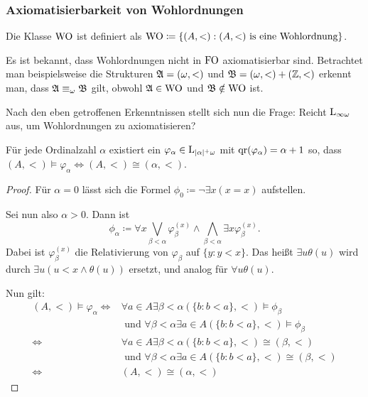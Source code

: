 \subsubsection*{Axiomatisierbarkeit von Wohlordnungen}

\begin{definition}
	Die Klasse $\operatorname{WO}$ ist definiert als $\operatorname{WO}\coloneqq \{(A,<) : (A,<) \text{ is eine Wohlordnung}\}$.
\end{definition}

Es ist bekannt, dass Wohlordnungen nicht in $\operatorname{FO}$ axiomatisierbar sind. Betrachtet man beispielsweise die Strukturen $\mathfrak{A}=(\omega,<)$ und $\mathfrak{B}=(\omega,<)+(\mathbb{Z},<)$ erkennt man, dass $\mathfrak{A} \equiv_\omega \mathfrak{B}$ gilt, obwohl $\mathfrak{A}\in \operatorname{WO}$ und $\mathfrak{B}\notin \operatorname{WO}$ ist.

Nach den eben getroffenen Erkenntnissen stellt sich nun die Frage: Reicht $\operatorname{L}_{\infty\omega}$ aus, um Wohlordnungen zu axiomatisieren?

\begin{lemma}
	Für jede Ordinalzahl $\alpha$ existiert ein $\varphi_\alpha\in \operatorname{L}_{\vert \alpha \vert^+\omega}$ mit $\operatorname{qr}(\varphi_\alpha)=\alpha+1$ so, dass $(A,<) \models \varphi_\alpha \Leftrightarrow (A,<) \cong (\alpha,<)$.
\end{lemma}
\begin{proof}
	Für $\alpha=0$ lässt sich die Formel $\phi_0\coloneqq \neg\exists x(x=x)$ aufstellen.
	
	Sei nun also $\alpha > 0$. Dann ist 
	\[\phi_\alpha\coloneqq \forall x \bigvee_{\beta<\alpha} \varphi_\beta^{(x)} \land \bigwedge_{\beta<\alpha} \exists x \varphi_\beta^{(x)}.\] 
	Dabei ist $\varphi_\beta^{(x)}$ die Relativierung von $\varphi_\beta$ auf $\{y : y<x\}$. Das heißt $\exists u \theta(u)$ wird durch $\exists u(u<x \land \theta(u))$ ersetzt, und analog für $\forall u\theta(u)$.
	
	Nun gilt:
	\begin{align*}
		(A,<)\models \varphi_\alpha \Leftrightarrow& \forall a\in A \exists \beta < \alpha (\{b : b<a\}, <) \models \phi_\beta \\
		& \text{ und } \forall \beta < \alpha \exists a\in A (\{b : b<a\}, <) \models \phi_\beta \\
		\Leftrightarrow& \forall a\in A \exists \beta < \alpha (\{b : b<a\}, <) \cong (\beta,<) \\
		& \text{ und } \forall \beta < \alpha \exists a\in A (\{b : b<a\}, <) \cong (\beta,<) \\
		\Leftrightarrow& (A,<)\cong(\alpha,<)
	\end{align*}
\end{proof}

